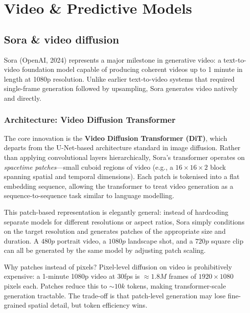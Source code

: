 
\section{Video \& Predictive Models}

\subsection{Sora \& video diffusion}

Sora (OpenAI, 2024) represents a major milestone in generative video: a text-to-video foundation model capable of producing coherent videos up to 1 minute in length at 1080p resolution. Unlike earlier text-to-video systems that required single-frame generation followed by upsampling, Sora generates video natively and directly.

\subsubsection{Architecture: Video Diffusion Transformer}

The core innovation is the \textbf{Video Diffusion Transformer (DiT)}, which departs from the U-Net-based architecture standard in image diffusion. Rather than applying convolutional layers hierarchically, Sora's transformer operates on \emph{spacetime patches}—small cuboid regions of video (e.g., a $16 \times 16 \times 2$ block spanning spatial and temporal dimensions). Each patch is tokenised into a flat embedding sequence, allowing the transformer to treat video generation as a sequence-to-sequence task similar to language modelling.

This patch-based representation is elegantly general: instead of hardcoding separate models for different resolutions or aspect ratios, Sora simply conditions on the target resolution and generates patches of the appropriate size and duration. A $480p$ portrait video, a $1080p$ landscape shot, and a $720p$ square clip can all be generated by the same model by adjusting patch scaling.

\begin{intuitionbox}
Why patches instead of pixels? Pixel-level diffusion on video is prohibitively expensive: a 1-minute 1080p video at 30fps is $\approx 1.8M$ frames of $1920 \times 1080$ pixels each. Patches reduce this to $\sim 10k$ tokens, making transformer-scale generation tractable. The trade-off is that patch-level generation may lose fine-grained spatial detail, but token efficiency wins.
\end{intuitionbox}

